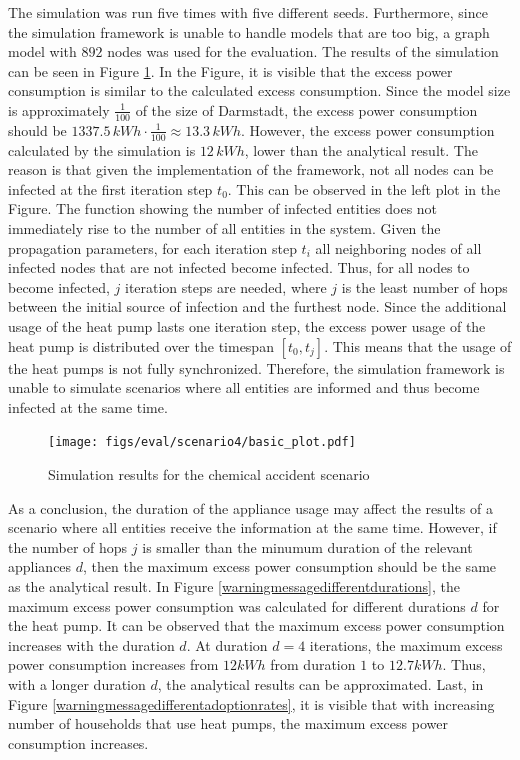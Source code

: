 The simulation was run five times with five different seeds. 
Furthermore, since the simulation framework is unable
to handle models that are too big, a graph model with 
$892$ nodes was used for the evaluation. 
The results of the simulation can be seen in 
Figure \ref{warningmessagesimulations}.
In the Figure, it is visible that the excess power 
consumption is similar to the calculated excess
consumption. Since the model size is approximately
$\frac{1}{100}$ of the size of Darmstadt, the 
excess power consumption should be
$1337.5\,kWh\cdot \frac{1}{100} \approx 13.3\,kWh $.
However, the excess power consumption 
calculated by the simulation is $12\,kWh$,
lower than the analytical result.
The reason is that given the implementation of the 
framework, not all nodes can be infected at the first
iteration step $t_0$. This can be observed in the 
left plot in the Figure. The function showing the 
number of infected entities does not immediately
rise to the number of all entities in the system.
Given the propagation 
parameters, for each iteration step $t_{i}$ all
neighboring nodes of all infected nodes that
are not infected become infected. Thus, for 
all nodes to become infected, $j$ iteration steps 
are needed, where $j$ is the least number of hops between 
the initial source of infection and the furthest 
node. Since the additional usage of the heat pump 
lasts one iteration step, the excess power usage
of the heat pump is distributed over 
the timespan $[t_0, t_j]$. 
This means that the 
usage of the heat pumps is not fully synchronized.
Therefore, the simulation framework is unable
to simulate scenarios where all entities 
are informed and thus become infected at the 
same time. 


\begin{figure}[!ht]
    \center
    \texttt{[image: figs/eval/scenario4/basic\_plot.pdf]}
    \caption{Simulation results for the chemical accident scenario}
    \label{warningmessagesimulations}
\end{figure}

As a conclusion, the duration of the appliance 
usage may affect the results of a scenario where 
all entities receive the information at the same time.
However, if the number of hops $j$ is smaller than
the minumum duration of the relevant appliances $d$,
then the maximum excess power consumption should 
be the same as the analytical result. 
In Figure \ref{warningmessagedifferentdurations},
the maximum excess power consumption was calculated
for different durations $d$ for the heat pump.
It can be observed that the maximum excess power 
consumption increases with the duration $d$.
At duration $d=4$ iterations, the maximum excess power consumption
increases from $12kWh$ from duration $1$ to 
$12.7kWh$. Thus, with a longer duration $d$, the 
analytical results can be approximated.
Last, in Figure \ref{warningmessagedifferentadoptionrates},
it is visible that with increasing number of households 
that use heat pumps, the maximum excess power consumption
increases.

